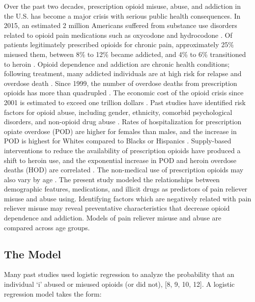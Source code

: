 \documentclass[sigconf]{acmart}
\begin{document}
Over the past two decades, prescription opioid misuse, abuse, and addiction 
in the U.S. has become a major crisis with serious public health consequences.
In 2015, an estimated 2 million Americans suffered from substance use disorders 
related to opioid pain medications such as oxycodone and hydrocodone 
\cite{nida18,cdc18}. Of patients legitimately prescribed opioids for chronic 
pain, approximately 25\% misused them, between 8\% to 12\% became addicted, and 
4\% to 6\% transitioned to heroin \cite{vowles15, carlson16}. Opioid dependence 
and addiction are chronic health conditions; following treatment, many addicted 
individuals are at high risk for relapse and overdose death \cite{shaham03}. 
Since 1999, the number of overdose deaths from prescription opioids has more 
than quadrupled \cite{cdc16}. The economic cost of the opioid crisis since 2001 
is estimated to exceed one trillion dollars \cite{altarum18}. Past studies have 
identified risk factors for opioid abuse, including gender, ethnicity, comorbid
psychological disorders, and non-opioid drug abuse \cite{yokell13,rice12}.
Rates of hospitalization for prescription opiate overdose (POD) are higher for 
females than males, and the increase in POD is highest for Whites compared to 
Blacks or Hispanics \cite{unick13}. Supply-based interventions to reduce the 
availability of prescription opioids have produced a shift to heroin use, and 
the exponential increase in POD and heroin overdose deaths (HOD) are correlated
\cite{jones15,reifler12}. The non-medical use of prescription opioids may also 
vary by age \cite{mccabe12}. The present study modeled the relationships 
between demographic features, medications, and illicit drugs as predictors of 
pain reliever misuse and abuse using. Identifying factors which are negatively 
related with pain reliever misuse may reveal preventative characteristics that 
decrease opioid dependence and addiction. Models of pain reliever misuse and 
abuse are compared across age groups. 




\subsection{The Model}
Many past studies used logistic regression to analyze the probability that an 
individual ‘i’ abused or misused opioids (or did not), [8, 9, 10, 12]. 
A logistic regression model takes the form:
\end{document}
